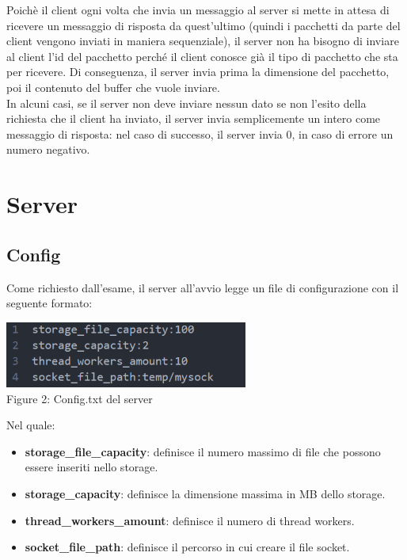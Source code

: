 \documentclass{article}
\begin{document}
Poichè il client ogni volta che invia un messaggio al server si mette in attesa di ricevere un messaggio di risposta da quest'ultimo (quindi i pacchetti da parte del 
client vengono inviati in maniera sequenziale), il server non ha bisogno di inviare al client l'id del pacchetto perché il client conosce già il tipo di pacchetto 
che sta per ricevere. Di conseguenza, il server invia prima la dimensione del pacchetto, poi il contenuto del buffer che vuole inviare. \\ In alcuni casi, se il server
non deve inviare nessun dato se non l'esito della richiesta che il client ha inviato, il server invia semplicemente un intero come messaggio di risposta:
nel caso di successo, il server invia 0, in caso di errore un numero negativo. 

\section{Server}

\subsection{Config}
Come richiesto dall'esame, il server all'avvio legge un file di configurazione con il seguente formato:

\begin{center}
    \includegraphics[width=80mm]{config} 
    \\Figure 2: Config.txt del server
\end{center}

Nel quale:
\begin{itemize}
    \itemsep 0em 
    \item \textbf{storage\_file\_capacity}: definisce il numero massimo di file che possono essere inseriti nello storage.
    \item \textbf{storage\_capacity}: definisce la dimensione massima in MB dello storage.
    \item \textbf{thread\_workers\_amount}: definisce il numero di thread workers.
    \item \textbf{socket\_file\_path}: definisce il percorso in cui creare il file socket.
\end{itemize}
\end{document}
